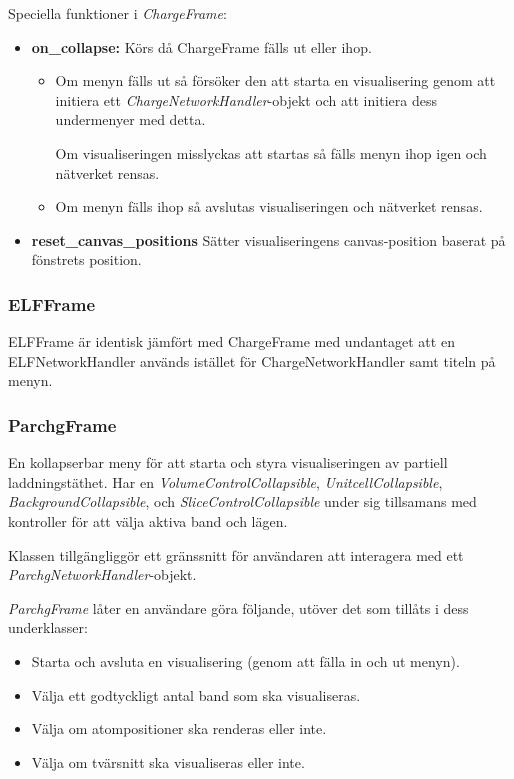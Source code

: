 
Speciella funktioner i \textit{ChargeFrame}:
\begin{itemize}
    \setlength\itemsep{0em}
    \item \textbf{on\_collapse: } Körs då ChargeFrame fälls ut eller ihop. 
    \begin{itemize}
        \setlength\itemsep{0em}
        \item Om menyn fälls ut så försöker den att starta en visualisering genom att initiera ett \textit{ChargeNetworkHandler}-objekt och att initiera dess undermenyer med detta. 
        
        Om visualiseringen misslyckas att startas så fälls menyn ihop igen och nätverket rensas.
        \item Om menyn fälls ihop så avslutas visualiseringen och nätverket rensas.
    \end{itemize}
    \item \textbf{reset\_canvas\_positions} Sätter visualiseringens canvas-position baserat på fönstrets position.
\end{itemize}


\subsubsection{ELFFrame}
ELFFrame är identisk jämfört med ChargeFrame med undantaget att en ELFNetworkHandler används istället för ChargeNetworkHandler samt titeln på menyn.

\subsubsection{ParchgFrame}
En kollapserbar meny för att starta och styra visualiseringen av partiell laddningstäthet. Har en \textit{VolumeControlCollapsible}, \textit{UnitcellCollapsible}, \textit{BackgroundCollapsible}, och \textit{SliceControlCollapsible} under sig tillsamans med kontroller för att välja aktiva band och lägen.

Klassen tillgängliggör ett gränssnitt för användaren att interagera med ett \textit{ParchgNetworkHandler}-objekt.

\textit{ParchgFrame} låter en användare göra följande, utöver det som tillåts i dess underklasser:
\begin{itemize}
    \setlength\itemsep{0em}
    \item Starta och avsluta en visualisering (genom att fälla in och ut menyn).
    \item Välja ett godtyckligt antal band som ska visualiseras.
    \item Välja om atompositioner ska renderas eller inte.
    \item Välja om tvärsnitt ska visualiseras eller inte.
\end{itemize}

